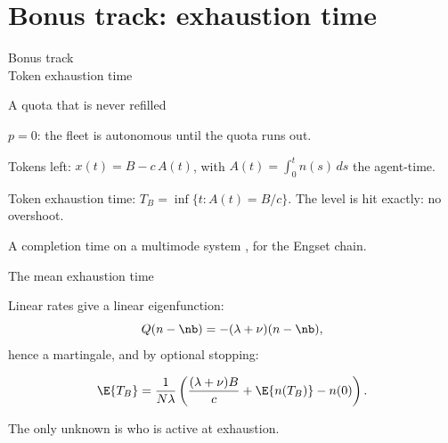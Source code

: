
\section*{Bonus track: exhaustion time}

\begin{frame}[plain]
	\vfill
	\begin{center}
		{\Huge \alert{Bonus track}}\\[1em]
		{\LARGE Token exhaustion time}
	\end{center}
	\vfill
\end{frame}

\begin{frame}{A quota that is never refilled}

	\begin{myitem}
		\item $p=0$: the fleet is \alert{autonomous} until the quota runs out.
		\item Tokens left: $x(t)=B-c\,A(t)$, with $A(t)=\int_0^t n(s)\,ds$ the \alert{agent-time}.
		\item Token exhaustion time: $T_B=\inf\{t: A(t)=B/c\}$. The level is hit \alert{exactly}: no overshoot.
		\item A completion time on a multimode system \cite{KNT1987}, for the Engset chain.
	\end{myitem}
\end{frame}

\begin{frame}{The mean exhaustion time}

	Linear rates give a linear eigenfunction:
	\begin{equation*}
		Q(n-\nb)=-(\lambda+\nu)(n-\nb),
	\end{equation*}
	hence a martingale, and by optional stopping:

	\vfill
	\pause

	\begin{proposition}
		\begin{equation*}
			\E{T_B} = \frac{1}{N\lambda}\left(\frac{(\lambda+\nu) B}{c} + \E{n(T_B)} - n(0)\right).
		\end{equation*}
	\end{proposition}

	\vfill
	\pause

	The only unknown is \alert{who is active} at exhaustion.
\end{frame}


